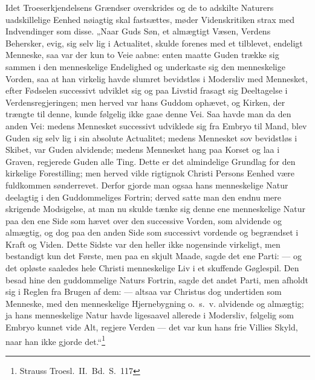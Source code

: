 \documentclass[12pt]{book}
\begin{document}
Idet Troeserkjendelsens Grændser overskrides og de to adskilte
Naturers uadskillelige Eenhed nøiagtig skal fastsættes, møder
Videnskritiken strax med Indvendinger som disse. „Naar Guds Søn, et
almægtigt Væsen, Verdens Behersker, evig, sig selv lig i Actualitet,
skulde forenes med et tilblevet, endeligt Menneske, saa var der kun
to Veie aabne: enten maatte Guden trække sig sammen i den
menneskelige Endelighed og underkaste sig den menneskelige Vorden,
saa at han virkelig havde slumret bevidstløs i Modersliv med
Mennesket, efter Fødselen successivt udviklet sig og paa Livstid
frasagt sig Deeltagelse i Verdensregjeringen; men herved var hans
Guddom ophævet, og Kirken, der trængte til denne, kunde følgelig
ikke gaae denne Vei. Saa havde man da den anden Vei: medens
Mennesket successivt udviklede sig fra Embryo til Mand, blev Guden
sig selv lig i sin absolute Actualitet; medens Mennesket sov
bevidstløs i Skibet, var Guden alvidende; medens Mennesket hang paa
Korset og laa i Graven, regjerede Guden alle Ting. Dette er det
almindelige Grundlag for den kirkelige Forestilling; men herved
vilde rigtignok Christi Persons Eenhed være fuldkommen sønderrevet.
Derfor gjorde man ogsaa hans menneskelige Natur deelagtig i den
Guddommeliges Fortrin; derved satte man den endnu mere skrigende
Modsigelse, at man nu skulde tænke sig denne ene menneskelige Natur
paa den ene Side som hævet over den successive Vorden, som alvidende
og almægtig, og dog paa den anden Side som successivt vordende og
begrændset i Kraft og Viden. Dette Sidste var den heller ikke
nogensinde virkeligt, men bestandigt kun det Første, men paa en
skjult Maade, sagde det ene Parti: --- og det opløste saaledes hele
Christi menneskelige Liv i et skuffende Gøglespil. Den besad hine den
guddommelige Naturs Fortrin, sagde det andet Parti, men afholdt sig
i Reglen fra Brugen af dem: --- altsaa var Christus dog undertiden
som
Menneske, med den menneskelige Hjernebygning o.\ s.\ v. alvidende og
almægtig; ja hans menneskelige Natur havde ligesaavel allerede i
Modersliv, følgelig som Embryo kunnet vide Alt, regjere Verden ---
det var kun hans frie Villies Skyld, naar han ikke gjorde
det.“\footnote{Strauss Troesl.\ II.\ Bd.\ S.\ 117}
\end{document}
